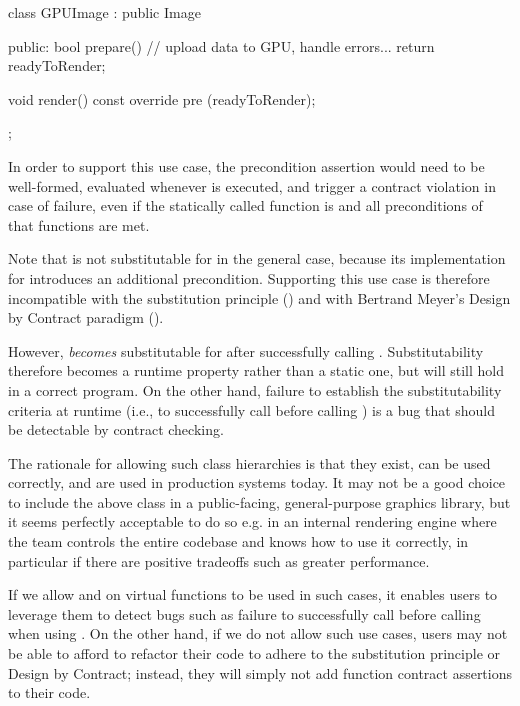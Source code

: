 \begin{codeblock}
class GPUImage : public Image {
public:
  bool prepare() { 
    // upload data to GPU, handle errors...
    return readyToRender;
  }
  
  void render() const override
    pre (readyToRender);
};
\end{codeblock}

In order to support this use case, the precondition assertion  would need to be well-formed, evaluated whenever  is executed, and trigger a contract violation in case of failure, even if the statically called function is  and all preconditions of that functions are met.

Note that  is not substitutable for  in the general case, because its implementation for  introduces an additional precondition. Supporting this use case is therefore incompatible with the substitution principle () and with Bertrand Meyer's Design by Contract paradigm ().

However,  \emph{becomes} substitutable for  after successfully calling . Substitutability therefore becomes a runtime property rather than a static one, but will still hold in a correct program. On the other hand, failure to establish the substitutability criteria at runtime (i.e., to successfully call  before calling ) is a bug that should be detectable by contract checking.

The rationale for allowing such class hierarchies is that they exist, can be used correctly, and are used in production systems today. It may not be a good choice to include the above  class in a public-facing, general-purpose graphics library, but it seems perfectly acceptable to do so e.g. in an internal rendering engine where the team controls the entire codebase and knows how to use it correctly, in particular if there are positive tradeoffs such as greater performance. 

If we allow  and  on virtual functions to be used in such cases, it enables users to leverage them to detect bugs such as failure to  successfully call  before calling  when using . On the other hand, if we do not allow such use cases, users may not be able to afford to refactor their code to adhere to the substitution principle or Design by Contract; instead, they will simply not add function contract assertions to their code.


